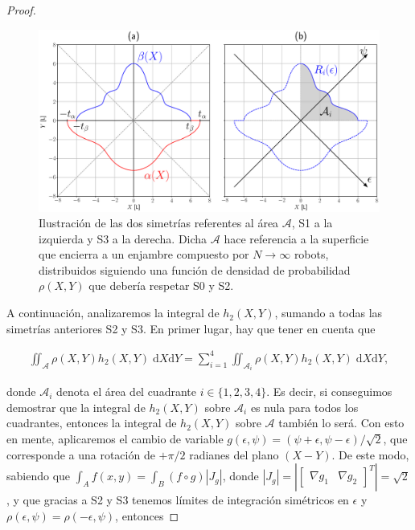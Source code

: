 \begin{proof}
\begin{figure}[!h]
\centering
\includegraphics[trim={1cm 3.0cm 1.0cm 4.0cm}, clip, width=1\columnwidth]{./fig/obs_xxyy.eps}
\caption{Ilustración de las dos simetrías referentes al área $\mathcal{A}$, S1 a la izquierda y S3 a la derecha. Dicha $\mathcal{A}$ hace referencia a la superficie que encierra a un enjambre compuesto por $N\to\infty$ robots, distribuidos siguiendo una función de densidad de probabilidad $\rho(X,Y)$ que debería respetar S0 y S2.}
\label{fig: obs_xxyy}
\end{figure}

A continuación, analizaremos la integral de $h_2(X,Y)$, sumando a todas las simetrías anteriores S2 y S3. En primer lugar, hay que tener en cuenta que 

\begin{align*}
\iint_{\mathcal{A}} \rho(X,Y) h_2(X,Y) \; \mathrm{d}X \mathrm{d}Y 
=
\sum_{i=1}^4
\iint_{\mathcal{A}_i} \rho(X,Y) h_2(X,Y) \; \mathrm{d}X \mathrm{d}Y,
\end{align*}

donde $\mathcal{A}_i$ denota el área del cuadrante $i \in \{1,2,3,4\}$. Es decir, si conseguimos demostrar que la integral de $h_2(X,Y)$ sobre $\mathcal{A}_i$ es nula para todos los cuadrantes, entonces la integral de $h_2(X,Y)$ sobre $\mathcal{A}$ también lo será. Con esto en mente, aplicaremos el cambio de variable $g(\epsilon,\psi) = (\psi + \epsilon, \psi - \epsilon)/\sqrt{2}$, que corresponde a una rotación de $+\pi/2$ radianes del plano $(X-Y)$. De este modo, sabiendo que $\int_{A} f(x,y) = \int_{B} (f \circ g) |J_g|$, donde $|J_g| = |\begin{bmatrix}\nabla g_1 & \nabla g_2 \end{bmatrix}^T| = \sqrt{2}$, y que gracias a S2 y S3 tenemos límites de integración simétricos en $\epsilon$ y $\rho(\epsilon,\psi) = \rho(-\epsilon,\psi)$, entonces


\end{proof}
